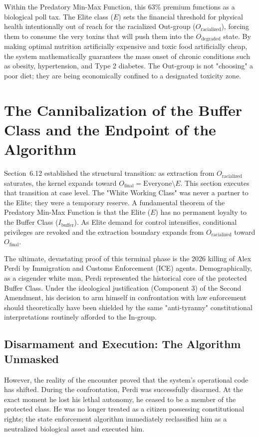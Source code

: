 \documentclass[12pt,openany]{book}
\begin{document}
Within the Predatory Min-Max Function, this 63\% premium functions as a biological poll tax. The Elite class ($E$) sets the financial threshold for physical health intentionally out of reach for the racialized Out-group ($O_{\text{racialized}}$), forcing them to consume the very toxins that will push them into the $O_{\text{degraded}}$ state. By making optimal nutrition artificially expensive and toxic food artificially cheap, the system mathematically guarantees the mass onset of chronic conditions such as obesity, hypertension, and Type 2 diabetes. The Out-group is not "choosing" a poor diet; they are being economically confined to a designated toxicity zone.

\section{The Cannibalization of the Buffer Class and the Endpoint of the Algorithm}

Section~6.12 established the structural transition: as extraction from $O_{\text{racialized}}$ saturates, the kernel expands toward $O_{\text{final}}=\text{Everyone}\setminus E$. This section executes that transition at case level. The "White Working Class" was never a partner to the Elite; they were a temporary reserve. A fundamental theorem of the Predatory Min-Max Function is that the Elite ($E$) has no permanent loyalty to the Buffer Class ($I_{\text{buffer}}$). As Elite demand for control intensifies, conditional privileges are revoked and the extraction boundary expands from $O_{\text{racialized}}$ toward $O_{\text{final}}$.

The ultimate, devastating proof of this terminal phase is the 2026 killing of Alex Perdi by Immigration and Customs Enforcement (ICE) agents. Demographically, as a cisgender white man, Perdi represented the historical core of the protected Buffer Class. Under the ideological justification (Component 3) of the Second Amendment, his decision to arm himself in confrontation with law enforcement should theoretically have been shielded by the same "anti-tyranny" constitutional interpretations routinely afforded to the In-group.

\subsection{Disarmament and Execution: The Algorithm Unmasked}
However, the reality of the encounter proved that the system's operational code has shifted. During the confrontation, Perdi was successfully disarmed. At the exact moment he lost his lethal autonomy, he ceased to be a member of the protected class. He was no longer treated as a citizen possessing constitutional rights; the state enforcement algorithm immediately reclassified him as a neutralized biological asset and executed him.
\end{document}

